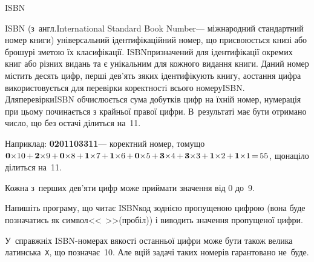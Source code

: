 \documentclass[14pt,a4paper]{extarticle}
\def\dib#1{\,#1\discretionary{}{\mbox{$#1$}}{}\,}
\begin{document}
\begin{problemAllDefault}{ISBN}

ISBN (з~англ.\nolinebreak[2] International Standard Book Number\nolinebreak[3] --- міжнародний стандартний номер книги) універсальний ідентифікаційний номер, що присвоюється книзі або брошурі з\nolinebreak[3] метою їх класифікації. ISBN\nolinebreak[3] призначений для ідентифікації окремих книг або різних видань та є унікальним для кожного видання книги. Даний номер містить десять цифр, перші дев'ять з\nolinebreak[3] яких ідентифікують книгу, а\nolinebreak[3] остання цифра використовується для перевірки коректності всього номеру\nolinebreak[3] ISBN. Для\nolinebreak[3] перевірки\nolinebreak[3] ISBN обчислюється сума добутків цифр на їхній номер, нумерація при цьому починається з крайньої правої цифри. В~результаті має бути отримано число, що без остачі ділиться на~11.

Наприклад: \textbf{0201103311}\nolinebreak[3] --- коректний номер, тому\nolinebreak[3] що ${\mathbf{0}{\*}10}\dib{{+}}{\mathbf{2}{\*}9}\dib{{+}}{\mathbf{0}{\*}8}\dib{{+}}{\mathbf{1}{\*}7}\dib{{+}}{\mathbf{1}{\*}6}\dib{{+}}{\mathbf{0}{\*}5}\dib{{+}}{\mathbf{3}{\*}4}\dib{{+}}{\mathbf{3}{\*}3}\dib{{+}}{\mathbf{1}{\*}2}\dib{{+}}{\mathbf{1}{\*}1}\dib{{=}}55$, що\nolinebreak[3] націло ділиться на~11.

Кожна з~перших дев'яти цифр може приймати значення від 0 до~9. 

Напишіть програму, що читає ISBN\nolinebreak[2] код з\nolinebreak[3] однією пропущеною цифрою (вона буде позначатись як символ\nolinebreak[2] <<~>>\nolinebreak[3] (пробіл)) і виводить значення пропущеної цифри.


\Example
\begin{exampleSimple}{5em}{3em}%
%
\end{exampleSimple}

\Note	У~справжніх ISBN-номерах в\nolinebreak[3] якості останньої цифри може бути також велика латинська~\texttt{X}, що позначає~10. Але в\nolinebreak[3] цій задачі таких номерів гарантовано не~буде.

\end{problemAllDefault}
	
\end{document}
